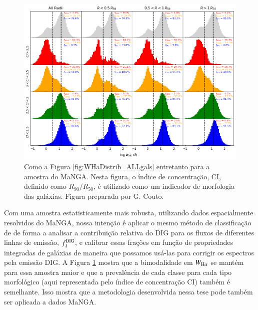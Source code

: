\begin{figure}
	\centering
	\includegraphics[scale=0.6]{figuras/fig_WHa_histo_per_CI_and_R_cumulFHa_MaNGA.png}
	\caption[MaNGA: Histogramas de $W_{{\rm H}\alpha}$]
	{Como a Figura \ref{fig:WHaDistrib_ALLgals} entretanto para a amostra do MaNGA. Nesta figura, o índice de concentração, CI, definido como $R_{90}/R_{50}$, é utilizado como um indicador de morfologia das galáxias. Figura preparada por G. Couto.}
	\label{fig:WHaDistrib_ALLgals_MaNGA}
\end{figure}

Com uma amostra estatisticamente mais robusta, utilizando dados espacialmente resolvidos do MaNGA, nossa intenção é aplicar o mesmo método de classificação de \citet[][Apêndice \ref{apendice:DIGpaper0}]{Lacerda.etal.2018} de forma a analisar a contribuição relativa do DIG para os  fluxos de diferentes linhas de emissão, $f_\lambda^{\rm DIG}$, e calibrar essas frações em função de propriedades integradas de galáxias de maneira que possamos usá-las para corrigir os espectros pela emissão DIG. A Figura \ref{fig:WHaDistrib_ALLgals_MaNGA} mostra que a bimodalidade em $W_{\Ha}$ se mantém para essa amostra maior e que a prevalência de cada classe para cada tipo morfológico (aqui representada pelo índice de concentração CI) também é semelhante. Isso mostra que a metodologia desenvolvida nessa tese pode também ser aplicada a dados MaNGA.

